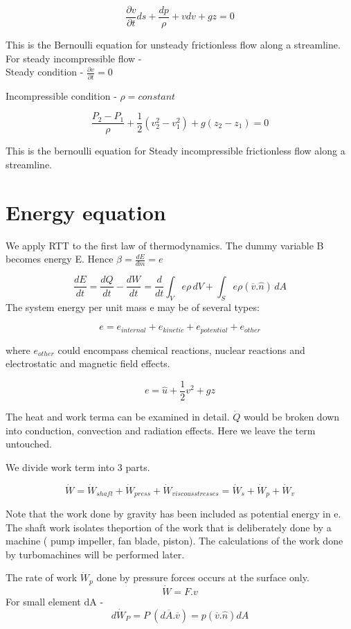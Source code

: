 \documentclass{report}
\begin{document}
\[ \frac{\partial v}{\partial t} ds + \frac{dp}{\rho} + vdv + gz = 0 \]

This is the Bernoulli equation for unsteady frictionless flow along a streamline.
For steady incompressible flow - \\

Steady condition - \(\frac{\partial v}{\partial t} =0\)

Incompressible condition - \(\rho = constant \)

\[ \frac{P_2-P_1}{\rho} + \frac{1}{2}(v_2^2 - v_1^2) + g(z_2-z_1) = 0\]

This is the bernoulli equation for Steady incompressible frictionless flow along a streamline.

\section{Energy equation}
We apply RTT to the first law of thermodynamics. The dummy variable B becomes energy E. Hence \( \beta =\frac{dE}{dm} = e\)

\[ \frac{dE}{dt} =\frac{dQ}{dt} - \frac{dW}{dt} = \frac{d}{dt} \int_V e\rho \,dV + \int_S e\rho (\overline{v}.\hat{n}) \,dA \]
The system energy per unit mass e may be of several types:

\[ e = e_{internal}+e_{kinetic}+e_{potential}+e_{other}\]

where \(e_{other}\) could encompass chemical reactions, nuclear reactions and electrostatic and magnetic field effects.

\[e = \hat{u} + \frac{1}{2}v^2 + gz\]

The heat and work terma can be examined in detail. \(\dot{Q}\) would be broken down into conduction,
convection and radiation effects. Here we leave the term untouched.

We divide work term into 3 parts.

\[ \dot{W}=\dot{W}_{shaft} + \dot{W}_{press} + \dot{W}_{viscous stresses} = \dot{W}_{s} + \dot{W}_{p} + \dot{W}_{v} \]

Note that the work done by gravity has been included as potential energy in e. The shaft work isolates theportion of the work
that is deliberately done by a machine ( pump impeller, fan blade, piston). The calculations of the work done by turbomachines will be performed later.

The rate of work \(\dot{W}_p\) done by pressure forces occurs at the surface only.
\[\dot{W}= F.v\]
For small element dA -
\[ d \dot{W}_P = P \ (d \overline{A} . \overline{v}) = p (\overline{v}.\hat{n}) dA \]
\end{document}
